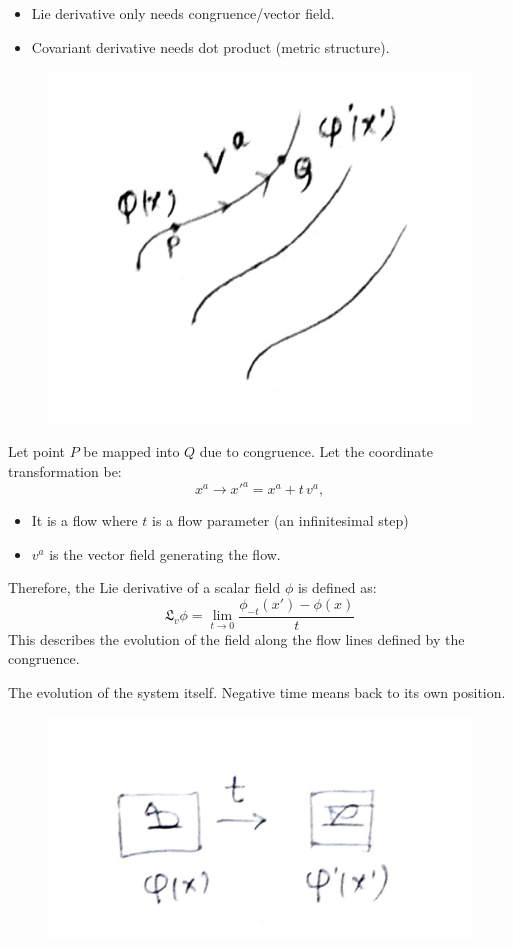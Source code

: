 \documentclass[14pt]{article} %
\begin{document}
\begin{itemize}
    \item Lie derivative only needs congruence/vector field.
    \item Covariant derivative needs dot product (metric structure).
\end{itemize}
\begin{figure}[H]
\centering
\includegraphics[width=0.3\linewidth]{L3_3.jpg}
\caption*{}
\end{figure}
\vspace{-1cm}
Let point $P$ be mapped into $Q$ due to congruence. Let the coordinate transformation be:
\[
x^a \rightarrow x'^a = x^a + t \,v^a,
\]
\begin{itemize}
    \item It is a flow where $t$ is a flow parameter (an infinitesimal step)
    \item $v^a$ is the vector field generating the flow.
\end{itemize}
Therefore, the Lie derivative of a scalar field $\phi$ is defined as:
\[
\boxed{\mathfrak{L}_v \phi = \lim_{t \to 0} \frac{\phi_{-t}(x') - \phi(x)}{t}}
\]
\noindent This describes the evolution of the field along the flow lines defined by the congruence.
\begin{tcolorbox}[proofbox, title=Note: Why $\phi_{-t}(x')~?$]
The evolution of the system itself. Negative time means back to its own position.
\begin{figure}[H]
\centering
\includegraphics[width=0.35\linewidth]{L3_4.jpg}
\caption*{}
\end{figure}
\vspace{-1cm}
\end{tcolorbox}
\end{document}
